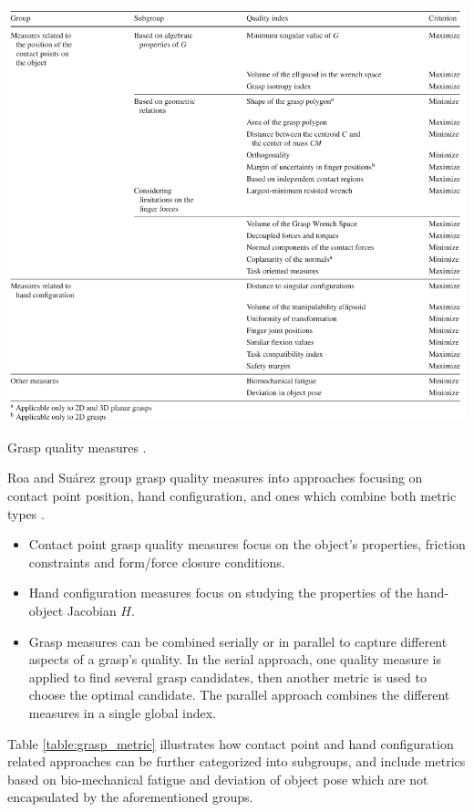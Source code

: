 \documentclass[12pt]{article}
\begin{document}
    \begin{table}[H]
        \includegraphics[width=\textwidth]{roa_suarez-2015-grasp_metrics}
        \caption{Grasp quality measures \cite{Roa2015}.}
        \label{table:grasp_metric}
    \end{table}

    Roa and Su{\'a}rez group grasp quality measures into approaches focusing on contact point position, hand configuration, and ones which combine both metric types \cite{Roa2015}.
    \begin{itemize}
        \item Contact point grasp quality measures focus on the object's properties, friction constraints and form/force closure conditions.
        \item Hand configuration measures focus on studying the properties of the hand-object Jacobian $H$.
        \item Grasp measures can be combined serially or in parallel to capture different aspects of a grasp's quality. In the serial approach, one quality measure is applied to find several grasp candidates, then another metric is used to choose the optimal candidate. The parallel approach combines the different measures in a single global index.
    \end{itemize}
    Table \ref{table:grasp_metric} illustrates how contact point and hand configuration related approaches can be further categorized into subgroups, and include metrics based on bio-mechanical fatigue and deviation of object pose which are not encapsulated by the aforementioned groups.
\end{document}
